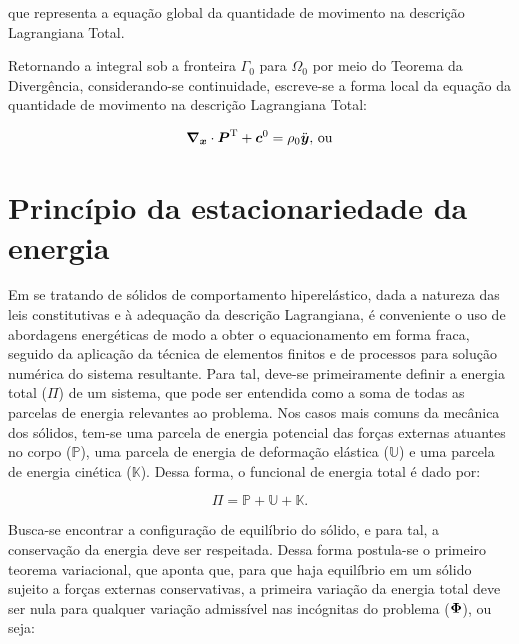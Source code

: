 \noindent que representa a equação global da quantidade de movimento na descrição Lagrangiana Total.

Retornando a integral sob a fronteira $\Gamma_0$ para $\Omega_0$ por meio do Teorema da Divergência, considerando-se continuidade, escreve-se a forma local da equação da quantidade de movimento na descrição Lagrangiana Total:

\begin{equation}
    \boldsymbol{\nabla_x}\cdot\boldsymbol{P}^\mathrm{T}+\boldsymbol{c}^0=\rho_0\ddot{\boldsymbol{y}}\text{, ou}
\end{equation}

\section{Princípio da estacionariedade da energia}

Em se tratando de sólidos de comportamento hiperelástico, dada a natureza das leis constitutivas e à adequação da descrição Lagrangiana, é conveniente o uso de abordagens energéticas de modo a obter o equacionamento em forma fraca, seguido da aplicação da técnica de elementos finitos e de processos para solução numérica do sistema resultante. Para tal, deve-se primeiramente definir a energia total ($\Pi$) de um sistema, que pode ser entendida como a soma de todas as parcelas de energia relevantes ao problema. Nos casos mais comuns da mecânica dos sólidos, tem-se uma parcela de energia potencial das forças externas atuantes no corpo ($\mathbb{P}$), uma parcela de energia de deformação elástica ($\mathbb{U}$) e uma parcela de energia cinética ($\mathbb{K}$). Dessa forma, o funcional de energia total é dado por:\aquiiii

\begin{equation}
    \Pi=\mathbb{P}+\mathbb{U}+\mathbb{K}\text{.}
    \label{FuncionalEnergia}
\end{equation}

Busca-se encontrar a configuração de equilíbrio do sólido, e para tal, a conservação da energia deve ser respeitada. Dessa forma postula-se o primeiro teorema variacional, que aponta que, para que haja equilíbrio em um sólido sujeito a forças externas conservativas, a primeira variação da energia total deve ser nula para qualquer variação admissível nas incógnitas do problema ($\boldsymbol{\Phi}$), ou seja:

